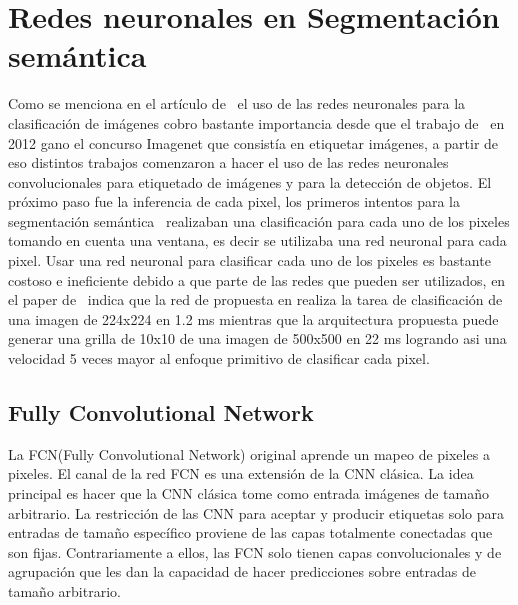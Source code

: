 \section{Redes neuronales en Segmentación semántica}
Como se menciona en el artículo de~\cite{long2015fully} el uso de las redes neuronales para la clasificación de imágenes cobro bastante importancia desde que el trabajo de~\cite{krizhevsky2012imagenet} en 2012 gano el concurso Imagenet que consistía en etiquetar imágenes, a partir de eso distintos trabajos comenzaron a hacer el uso de las redes neuronales convolucionales para etiquetado de imágenes y para la detección de objetos.
El próximo paso fue la inferencia de cada pixel, los primeros intentos para la segmentación semántica~\cite{ning2005toward ,   ciresan2012deep , farabet2013learning} realizaban una clasificación para cada uno de los pixeles tomando en cuenta una ventana, es decir se utilizaba una red neuronal para cada pixel. Usar una red neuronal para clasificar cada uno de los pixeles es bastante costoso e ineficiente debido a que parte de las redes que pueden ser utilizados, en el paper de~\cite{long2015fully} indica que la red de propuesta en \cite{krizhevsky2012imagenet}  realiza la tarea de clasificación de una imagen de 224x224 en 1.2 ms mientras que la arquitectura propuesta  puede generar una grilla de 10x10 de una imagen de 500x500 en 22 ms logrando asi una velocidad 5 veces mayor al enfoque primitivo de clasificar cada pixel.

\subsection{Fully Convolutional Network}
La \gls{FCN}(Fully Convolutional Network) original aprende un mapeo de pixeles a pixeles\cite{long2015fully}. El canal de la red \gls{FCN} es una extensión de la \gls{CNN} clásica. La idea principal es hacer que la \gls{CNN} clásica tome como entrada imágenes de tamaño arbitrario. La restricción de las \gls{CNN} para aceptar y producir etiquetas solo para entradas de tamaño específico proviene de las capas totalmente conectadas que son fijas. Contrariamente a ellos, las \gls{FCN} solo tienen capas convolucionales y de agrupación que les dan la capacidad de hacer predicciones sobre entradas de tamaño arbitrario. 


